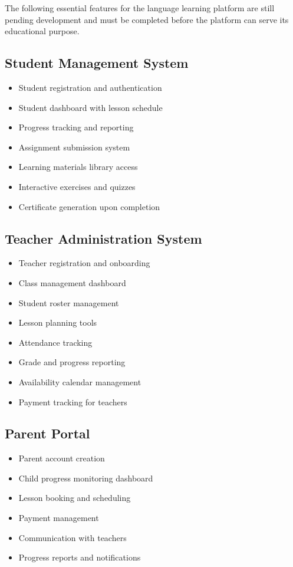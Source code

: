 \documentclass[11pt,a4paper]{article}
\begin{document}
\begin{tcolorbox}[colback=red!10, colframe=red!50!black, title=\textbf{CRITICAL: Core Platform Features Not Yet Implemented}]
The following essential features for the language learning platform are still pending development and must be completed before the platform can serve its educational purpose.
\end{tcolorbox}

\subsection{Student Management System}
\begin{itemize}[leftmargin=*]
    \item Student registration and authentication
    \item Student dashboard with lesson schedule
    \item Progress tracking and reporting
    \item Assignment submission system
    \item Learning materials library access
    \item Interactive exercises and quizzes
    \item Certificate generation upon completion
\end{itemize}

\subsection{Teacher Administration System}
\begin{itemize}[leftmargin=*]
    \item Teacher registration and onboarding
    \item Class management dashboard
    \item Student roster management
    \item Lesson planning tools
    \item Attendance tracking
    \item Grade and progress reporting
    \item Availability calendar management
    \item Payment tracking for teachers
\end{itemize}

\subsection{Parent Portal}
\begin{itemize}[leftmargin=*]
    \item Parent account creation
    \item Child progress monitoring dashboard
    \item Lesson booking and scheduling
    \item Payment management
    \item Communication with teachers
    \item Progress reports and notifications
\end{itemize}
\end{document}
